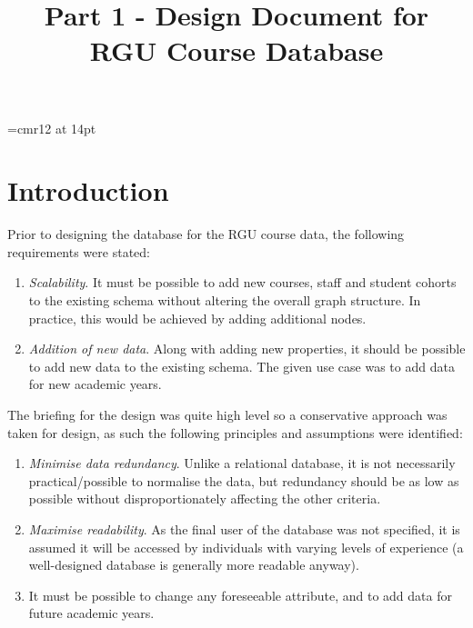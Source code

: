 \documentclass[10pt]{article}
\begin{document}
\font\myfont=cmr12 at 14pt
\title{{\myfont Part 1 -  Design Document for RGU Course Database }}
\author{\vspace{-10ex}}
\date{\vspace{-10ex}}
\maketitle
\vspace{-1cm}


\section{Introduction}
% 
% 
% 
% 
Prior to designing the database for the RGU course data, the following requirements were stated:
\begin{enumerate}
\item  \textit{Scalability}. It must be possible to add new courses, staff and student cohorts to the existing schema without altering the overall graph structure. In practice, this would be achieved by adding additional nodes.
\item \textit{Addition of new data}. Along with adding new properties, it should be possible to add new data to the existing schema. The given use case was to add data for new academic years.
\end{enumerate}
The briefing for the design was quite high level so a conservative approach was taken for design, as such the following principles and assumptions were identified:
\begin{enumerate}[label=\Alph*]
\item \textit{Minimise data redundancy}. Unlike a relational database, it is not necessarily practical/possible to normalise the data, but redundancy should be as low as possible without disproportionately affecting the other criteria.
\item \textit{ Maximise readability}. As the final user of the database was not specified, it is assumed it will be accessed by individuals with varying levels of experience (a well-designed database is generally more readable anyway). 
\item It must be possible to change any foreseeable attribute, and to add data for future academic years.

\end{enumerate}
\end{document}
